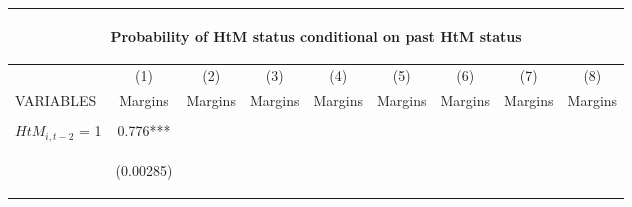 \begin{center}
\begin{tabular}{lcccccccc}
\multicolumn{9}{c}{\begin{large}Probability of HtM status conditional on past HtM status\end{large}} \\ \hline
 & (1) & (2) & (3) & (4) & (5) & (6) & (7) & (8) \\
VARIABLES & Margins & Margins & Margins & Margins & Margins & Margins & Margins & Margins \\ \hline
\vspace{4pt} & \begin{footnotesize}\end{footnotesize} & \begin{footnotesize}\end{footnotesize} & \begin{footnotesize}\end{footnotesize} & \begin{footnotesize}\end{footnotesize} & \begin{footnotesize}\end{footnotesize} & \begin{footnotesize}\end{footnotesize} & \begin{footnotesize}\end{footnotesize} & \begin{footnotesize}\end{footnotesize} \\
$ {HtM}_{i, t-2} $ = 1 & 0.776*** &  &  &  &  &  &  &  \\
\vspace{4pt} & \begin{footnotesize}(0.00285)\end{footnotesize} & \begin{footnotesize}\end{footnotesize} & \begin{footnotesize}\end{footnotesize} & \begin{footnotesize}\end{footnotesize} & \begin{footnotesize}\end{footnotesize} & \begin{footnotesize}\end{footnotesize} & \begin{footnotesize}\end{footnotesize} & \begin{footnotesize}\end{footnotesize} \\

\end{tabular}
\end{center}
